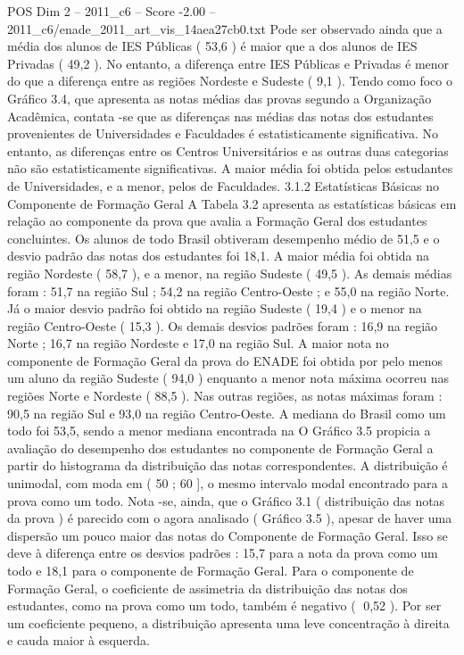 \begin{textsample}{POS Dim 2 – 2011\_c6 – Score -2.00 – 2011\_c6/enade\_2011\_art\_vis\_14aea27cb0.txt}
Pode ser observado ainda que a média dos alunos de IES Públicas ( 53,6 ) é maior que a dos alunos de IES Privadas ( 49,2 ).
No entanto, a diferença entre IES Públicas e Privadas é menor do que a diferença entre as regiões Nordeste e Sudeste ( 9,1 ).
Tendo como foco o Gráfico 3.4, que apresenta as notas médias das provas segundo a Organização Acadêmica, contata -se que as diferenças nas médias das notas dos estudantes provenientes de Universidades e Faculdades é estatisticamente significativa.
No entanto, as diferenças entre os Centros Universitários e as outras duas categorias não são estatisticamente significativas.
A maior média foi obtida pelos estudantes de Universidades, e a menor, pelos de Faculdades. 3.1.2 Estatísticas Básicas no Componente de Formação Geral A Tabela 3.2 apresenta as estatísticas básicas em relação ao componente da prova que avalia a Formação Geral dos estudantes concluintes.
Os alunos de todo Brasil obtiveram desempenho médio de 51,5 e o desvio padrão das notas dos estudantes foi 18,1.
A maior média foi obtida na região Nordeste ( 58,7 ), e a menor, na região Sudeste ( 49,5 ).
As demais médias foram : 51,7 na região Sul ; 54,2 na região Centro-Oeste ; e 55,0 na região Norte.
Já o maior desvio padrão foi obtido na região Sudeste ( 19,4 ) e o menor na região Centro-Oeste ( 15,3 ).
Os demais desvios padrões foram : 16,9 na região Norte ; 16,7 na região Nordeste e 17,0 na região Sul.
A maior nota no componente de Formação Geral da prova do ENADE foi obtida por pelo menos um aluno da região Sudeste ( 94,0 ) enquanto a menor nota máxima ocorreu nas regiões Norte e Nordeste ( 88,5 ).
Nas outras regiões, as notas máximas foram : 90,5 na região Sul e 93,0 na região Centro-Oeste.
A mediana do Brasil como um todo foi 53,5, sendo a menor mediana encontrada na O Gráfico 3.5 propicia a avaliação do desempenho dos estudantes no componente de Formação Geral a partir do histograma da distribuição das notas correspondentes.
A distribuição é unimodal, com moda em ( 50 ; 60 ], o mesmo intervalo modal encontrado para a prova como um todo.
Nota -se, ainda, que o Gráfico 3.1 ( distribuição das notas da prova ) é parecido com o agora analisado ( Gráfico 3.5 ), apesar de haver uma dispersão um pouco maior das notas do Componente de Formação Geral.
Isso se deve à diferença entre os desvios padrões : 15,7 para a nota da prova como um todo e 18,1 para o componente de Formação Geral.
Para o componente de Formação Geral, o coeficiente de assimetria da distribuição das notas dos estudantes, como na prova como um todo, também é negativo ( 0,52 ).
Por ser um coeficiente pequeno, a distribuição apresenta uma leve concentração à direita e cauda maior à esquerda.

\end{textsample}
